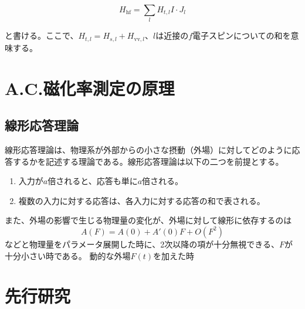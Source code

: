 \documentclass[11pt,a4j]{jreport}
\begin{document}
\begin{equation}
H_{\text{hf}} = \sum_{l} H_{t, l} I \cdot J_l
\end{equation}

と書ける。ここで、$H_{t, l} = H_{s, l} + H_{\text{vv}, l}$、$l$は近接の$f$電子スピンについての和を意味する。

\chapter{A.C.磁化率測定の原理}
\section{線形応答理論}
線形応答理論は、物理系が外部からの小さな摂動（外場）に対してどのように応答するかを記述する理論である。線形応答理論は以下の二つを前提とする。
\begin{enumerate}[label=\textnormal{(\Roman*)}]
  \item 入力が$a$倍されると、応答も単に$a$倍される。
  \item 複数の入力に対する応答は、各入力に対する応答の和で表される。
\end{enumerate}
また、外場の影響で生じる物理量の変化が、外場に対して線形に依存するのは
\begin{equation}
  A(F)=A(0)+A'(0)F+O(F^2)
\end{equation}
などと物理量をパラメータ展開した時に、2次以降の項が十分無視できる、$F$が十分小さい時である。
動的な外場$F(t)$を加えた時
\chapter{先行研究}
\end{document}

